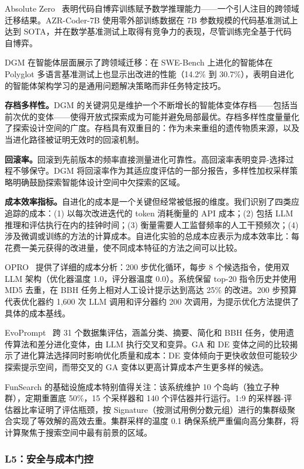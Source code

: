 Absolute Zero~\citep{absolutezero2025} 表明代码自博弈训练赋予数学推理能力——一个引人注目的跨领域迁移结果。AZR-Coder-7B 使用零外部训练数据在 7B 参数规模的代码基准测试上达到 SOTA，并在数学基准测试上取得有竞争力的表现，尽管训练完全基于代码自博弈。

DGM 在智能体层面展示了跨领域迁移：在 SWE-Bench 上进化的智能体在 Polyglot 多语言基准测试上也显示出改进的性能（14.2\% 到 30.7\%），表明自进化的智能体架构学习的是通用问题解决策略而非任务特定技巧。

\textbf{存档多样性。}DGM 的关键洞见是维护一个不断增长的智能体变体存档——包括当前次优的变体——使得开放式探索成为可能并避免局部最优。存档多样性度量量化了探索设计空间的广度。存档具有双重目的：作为未来重组的遗传物质来源，以及当进化路径被证明无效时的回滚机制。

\textbf{回滚率。}回滚到先前版本的频率直接测量进化可靠性。高回滚率表明变异-选择过程不够保守。DGM 将回滚率作为其适应度评估的一部分报告，多样性加权采样策略明确鼓励探索智能体设计空间中欠探索的区域。

\textbf{成本效率指标。}自进化的成本是一个关键但经常被低报的维度。我们识别了四类应追踪的成本：(1) 以每次改进迭代的 token 消耗衡量的 API 成本；(2) 包括 LLM 推理和评估执行在内的挂钟时间；(3) 衡量需要人工监督频率的人工干预频次；(4) 涉及微调或训练的方法的计算成本。自进化实验的总成本应表示为成本效率比：每花费一美元获得的改进量，使不同成本特征的方法之间可以比较。

OPRO~\citep{opro2023} 提供了详细的成本分析：200 步优化循环，每步 8 个候选指令，使用双 LLM 架构（优化器温度 1.0，评分器温度 0.0）。系统保留 top-20 指令历史并使用 MD5 去重，在 BBH 任务上相对人工设计提示达到高达 25\% 的改进。200 步预算代表优化器约 1,600 次 LLM 调用和评分器约 200 次调用，为提示优化方法提供了具体的成本基线。

EvoPrompt~\citep{evoprompt2024} 跨 31 个数据集评估，涵盖分类、摘要、简化和 BBH 任务，使用遗传算法和差分进化变体，由 LLM 执行交叉和变异。GA 和 DE 变体之间的比较揭示了进化算法选择同时影响优化质量和成本：DE 变体倾向于更快收敛但可能较少探索提示空间，而带交叉的 GA 变体以更高计算成本产生更多样的候选。

FunSearch 的基础设施成本特别值得关注：该系统维护 10 个岛屿（独立子种群），定期重置底 50\%，15 个采样器和 140 个评估器并行运行。1:9 的采样器-评估器比率证明了评估瓶颈，按 Signature（按测试用例分数元组）进行的集群级聚合实现了等效解的高效去重。集群采样的温度 0.1 确保系统严重偏向高分集群，将计算聚焦于搜索空间中最有前景的区域。


\subsubsection{L5：安全与成本门控}
\label{sec:eval-L5}

